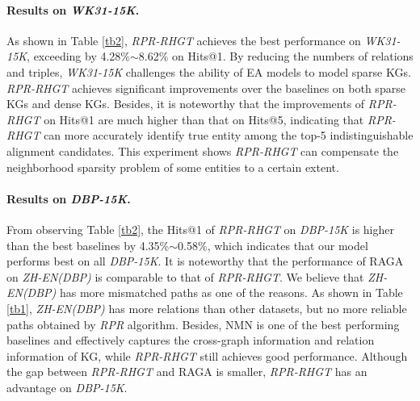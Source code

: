\documentclass{article}
\begin{document}
\paragraph{Results on \textit{WK31-15K}.}
As shown in Table \ref{tb2}, \textit{RPR-RHGT} achieves the best performance on \textit{WK31-15K}, exceeding by 4.28\%$\sim $8.62\% on Hits@1.
By reducing the numbers of relations and triples, \textit{WK31-15K} challenges the ability of EA models to model sparse KGs. 
\textit{RPR-RHGT} achieves significant improvements over the baselines on both sparse KGs and dense KGs.
Besides, it is noteworthy that the improvements of \textit{RPR-RHGT} on Hits@1 are much higher than that on Hits@5, indicating that \textit{RPR-RHGT} can more accurately identify true entity among the top-5 indistinguishable alignment candidates.
This experiment shows \textit{RPR-RHGT} can compensate the neighborhood sparsity problem of some entities to a certain extent.


\paragraph{Results on \textit{DBP-15K}.}
From observing Table \ref{tb2}, the Hits@1 of \textit{RPR-RHGT} on \textit{DBP-15K} is higher than the best baselines by 4.35\%$\sim $0.58\%, which indicates that our model performs best on all \textit{DBP-15K}.
It is noteworthy that the performance of RAGA on \textit{ZH-EN(DBP)} is comparable to that of \textit{RPR-RHGT}.
We believe that \textit{ZH-EN(DBP)} has more mismatched paths as one of the reasons.
As shown in Table \ref{tb1}, \textit{ZH-EN(DBP)} has more relations than other datasets, but no more reliable paths obtained by \textit{RPR} algorithm.
Besides, NMN is one of the best performing baselines and effectively captures the cross-graph information and relation information of KG, while \textit{RPR-RHGT} still achieves good performance. %
Although the gap between \textit{RPR-RHGT} and RAGA is smaller, \textit{RPR-RHGT} has an advantage on \textit{DBP-15K}.
\end{document}
